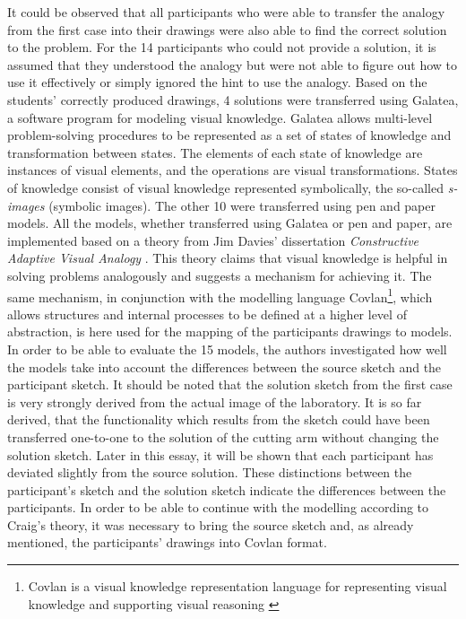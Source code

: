 \documentclass[12pt]{article}
\begin{document}
It could be observed that all participants who were able to transfer the analogy from the first case into their drawings were also able to find the correct solution to the problem. For the 14 participants who could not provide a solution, it is assumed that they understood the analogy but were not able to figure out how to use it effectively or simply ignored the hint to use the analogy. Based on the students' correctly produced drawings, 4 solutions were transferred using Galatea, a software program for modeling visual knowledge. Galatea allows multi-level problem-solving procedures to be represented as a set of states of knowledge and transformation between states. The elements of each state of knowledge are instances of visual elements, and the operations are visual transformations.  States of knowledge consist of visual knowledge represented symbolically, the so-called \textit{s-images} (symbolic images). The other 10 were transferred using pen and paper models. All the models, whether transferred using Galatea or pen and paper, are implemented based on a theory from Jim Davies' dissertation \textit{Constructive Adaptive Visual Analogy} \cite{davies2004constructive}. This theory claims that visual knowledge is helpful in solving problems analogously and suggests a mechanism for achieving it. The same mechanism, in conjunction with the modelling language Covlan\footnote{Covlan is a visual knowledge representation language for representing visual knowledge and supporting visual reasoning \cite{davies2007transfer}}, which allows structures and internal processes to be defined at a higher level of abstraction, is here used for the mapping of the participants drawings to models. In order to be able to evaluate the 15 models, the authors investigated how well the models take into account the differences between the source sketch and the participant sketch. It should be noted that the solution sketch from the first case is very strongly derived from the actual image of the laboratory. It is so far derived, that the functionality which results from the sketch could have been transferred one-to-one to the solution of the cutting arm without changing the solution sketch. Later in this essay, it will be shown that each participant has deviated slightly from the source solution. These distinctions between the participant's sketch and the solution sketch indicate the differences between the participants. In order to be able to continue with the modelling according to Craig's theory, it was necessary to bring the source sketch and, as already mentioned, the participants' drawings into Covlan format.
\end{document}
